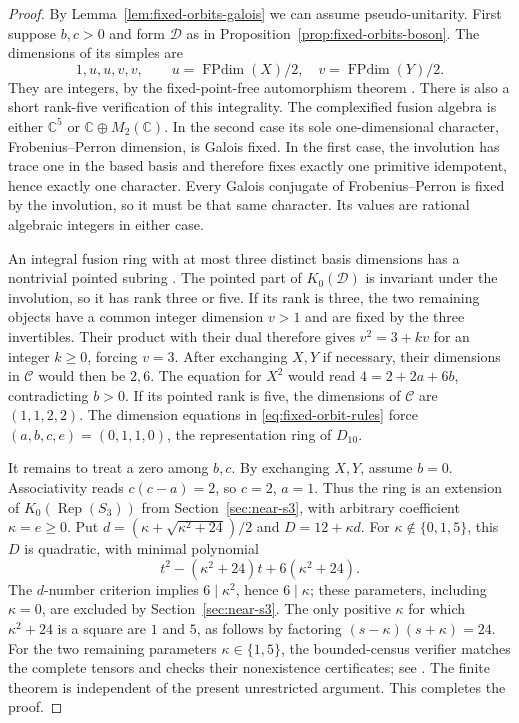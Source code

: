 \begin{proof}
By Lemma~\ref{lem:fixed-orbits-galois} we can assume pseudo-unitarity.
First suppose $b,c>0$ and form $\mathcal D$ as in
Proposition~\ref{prop:fixed-orbits-boson}. The dimensions of its simples are
\[
 1,u,u,v,v,\qquad
 u=\operatorname{FPdim}(X)/2,\quad
 v=\operatorname{FPdim}(Y)/2.
\]
They are integers, by the fixed-point-free automorphism theorem
\cite[Theorem~2.3]{SchopierayFPF}.
There is also a short rank-five verification of this integrality.
The complexified fusion algebra is either $\mathbb C^5$ or
$\mathbb C\oplus M_2(\mathbb C)$. In the second case its sole
one-dimensional character, Frobenius--Perron dimension, is Galois fixed.
In the first case, the involution has trace one in the based basis and
therefore fixes exactly one primitive idempotent, hence exactly one
character. Every Galois conjugate of Frobenius--Perron is fixed by the
involution, so it must be that same character. Its values are rational
algebraic integers in either case.

An integral fusion ring with at most three distinct basis dimensions has
a nontrivial pointed subring \cite[Lemma~4.2]{SchopierayFPF}.
The pointed part of $K_0(\mathcal D)$ is invariant under the involution,
so it has rank three or five. If its rank is three, the two remaining
objects have a common integer dimension $v>1$ and are fixed by the
three invertibles. Their product with their dual therefore gives
$v^2=3+kv$ for an integer $k\geq0$, forcing $v=3$. After exchanging $X,Y$ if necessary, their dimensions in
$\mathcal C$ would then be $2,6$. The equation for $X^2$ would read
$4=2+2a+6b$, contradicting $b>0$. If its pointed rank is five, the dimensions of
$\mathcal C$ are $(1,1,2,2)$. The dimension equations in
\eqref{eq:fixed-orbit-rules} force
$(a,b,c,e)=(0,1,1,0)$, the representation ring of $D_{10}$.

It remains to treat a zero among $b,c$. By exchanging $X,Y$, assume
$b=0$. Associativity reads $c(c-a)=2$, so $c=2$, $a=1$. Thus the ring
is an extension of $K_0(\operatorname{Rep}(S_3))$ from
Section~\ref{sec:near-s3}, with arbitrary coefficient $\kappa=e\geq0$.
Put $d=(\kappa+\sqrt{\kappa^2+24})/2$ and $D=12+\kappa d$.
For $\kappa\notin\{0,1,5\}$, this $D$ is quadratic, with minimal polynomial
\[
 t^2-(\kappa^2+24)t+6(\kappa^2+24).
\]
The $d$-number criterion implies $6\mid\kappa^2$, hence $6\mid\kappa$;
these parameters, including $\kappa=0$, are excluded by
Section~\ref{sec:near-s3}. The only positive $\kappa$ for which
$\kappa^2+24$ is a square are $1$ and $5$, as follows by factoring
$(s-\kappa)(s+\kappa)=24$. For the two remaining parameters $\kappa\in\{1,5\}$, the
bounded-census verifier matches the complete tensors and checks their
nonexistence certificates; see \cite[Theorem~\ref{B-thm:finite}]{Finite}.
The finite theorem is independent of the present unrestricted argument.
This completes the proof.
\end{proof}


